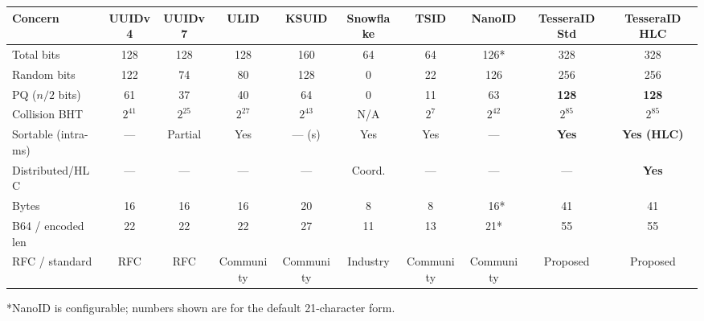 \begin{center}
\renewcommand{\arraystretch}{1.15}
\footnotesize
\begin{tabular}{lccccccccc}
\toprule
\textbf{Concern} & \textbf{UUIDv4} & \textbf{UUIDv7} & \textbf{ULID} & \textbf{KSUID} & \textbf{Snowflake} & \textbf{TSID} & \textbf{NanoID} & \textbf{TesseraID Std} & \textbf{TesseraID HLC} \\
\midrule
Total bits         & 128       & 128        & 128        & 160        & 64         & 64         & 126*       & 328                 & 328 \\
Random bits        & 122       & 74         & 80         & 128        & 0          & 22         & 126        & 256                 & 256 \\
PQ ($n/2$ bits)    & 61        & 37         & 40         & 64         & 0          & 11         & 63         & \textbf{128}        & \textbf{128} \\
Collision BHT      & $2^{41}$  & $2^{25}$   & $2^{27}$   & $2^{43}$   & N/A        & $2^{7}$    & $2^{42}$   & \textbf{$2^{85}$}   & \textbf{$2^{85}$} \\
Sortable (intra-ms)& ---       & Partial    & Yes        & --- (s)    & Yes        & Yes        & ---        & \textbf{Yes}        & \textbf{Yes (HLC)} \\
Distributed/HLC    & ---       & ---        & ---        & ---        & Coord.     & ---        & ---        & ---                 & \textbf{Yes} \\
Bytes              & 16        & 16         & 16         & 20         & 8          & 8          & ~16*       & 41                  & 41 \\
B64 / encoded len  & 22        & 22         & 22         & 27         & 11         & 13         & 21*        & 55                  & 55 \\
RFC / standard     & RFC       & RFC        & Community  & Community  & Industry   & Community  & Community  & Proposed            & Proposed \\
\bottomrule
\end{tabular}

\smallskip
\noindent\footnotesize{*NanoID is configurable; numbers shown are for the default 21-character form.}\normalsize
\end{center}

